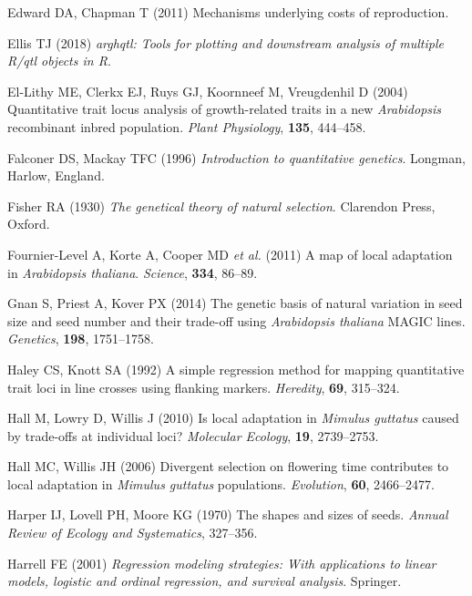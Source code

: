 \documentclass[]{article}
\begin{document}
\leavevmode\hypertarget{ref-edward2011mechanisms}{}%
Edward DA, Chapman T (2011) Mechanisms underlying costs of reproduction.

\leavevmode\hypertarget{ref-ellis_arghqtl}{}%
Ellis TJ (2018) \emph{\textup{arghqtl}: Tools for plotting and downstream analysis of multiple R/qtl objects in R}.

\leavevmode\hypertarget{ref-el2004quantitative}{}%
El-Lithy ME, Clerkx EJ, Ruys GJ, Koornneef M, Vreugdenhil D (2004) Quantitative trait locus analysis of growth-related traits in a new \emph{Arabidopsis} recombinant inbred population. \emph{Plant Physiology}, \textbf{135}, 444--458.

\leavevmode\hypertarget{ref-Falconer1996}{}%
Falconer DS, Mackay TFC (1996) \emph{Introduction to quantitative genetics}. Longman, Harlow, England.

\leavevmode\hypertarget{ref-Fisher1930}{}%
Fisher RA (1930) \emph{The genetical theory of natural selection}. Clarendon Press, Oxford.

\leavevmode\hypertarget{ref-fournier2011map}{}%
Fournier-Level A, Korte A, Cooper MD \emph{et al.} (2011) A map of local adaptation in \emph{Arabidopsis thaliana}. \emph{Science}, \textbf{334}, 86--89.

\leavevmode\hypertarget{ref-gnan2014genetic}{}%
Gnan S, Priest A, Kover PX (2014) The genetic basis of natural variation in seed size and seed number and their trade-off using \emph{Arabidopsis thaliana} MAGIC lines. \emph{Genetics}, \textbf{198}, 1751--1758.

\leavevmode\hypertarget{ref-Haley1992}{}%
Haley CS, Knott SA (1992) A simple regression method for mapping quantitative trait loci in line crosses using flanking markers. \emph{Heredity}, \textbf{69}, 315--324.

\leavevmode\hypertarget{ref-Hall2010}{}%
Hall M, Lowry D, Willis J (2010) Is local adaptation in \emph{Mimulus guttatus} caused by trade-offs at individual loci? \emph{Molecular Ecology}, \textbf{19}, 2739--2753.

\leavevmode\hypertarget{ref-Hall2006}{}%
Hall MC, Willis JH (2006) Divergent selection on flowering time contributes to local adaptation in \emph{Mimulus guttatus} populations. \emph{Evolution}, \textbf{60}, 2466--2477.

\leavevmode\hypertarget{ref-Harper1970}{}%
Harper IJ, Lovell PH, Moore KG (1970) The shapes and sizes of seeds. \emph{Annual Review of Ecology and Systematics}, 327--356.

\leavevmode\hypertarget{ref-harrell2001regression}{}%
Harrell FE (2001) \emph{Regression modeling strategies: With applications to linear models, logistic and ordinal regression, and survival analysis}. Springer.
\end{document}
